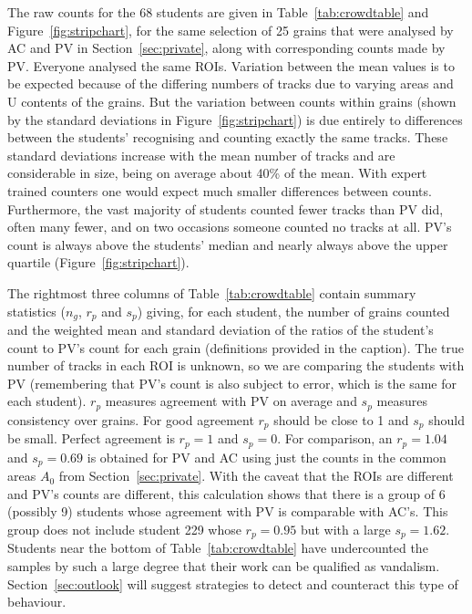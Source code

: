 \documentclass[gchron, manuscript]{copernicus}
\begin{document}
The raw counts for the 68 students are given in
Table~\ref{tab:crowdtable} and Figure~\ref{fig:stripchart}, for the
same selection of 25 grains that were analysed by AC and PV in
Section~\ref{sec:private}, along with corresponding counts made by
PV. Everyone analysed the same ROIs. Variation between the mean values
is to be expected because of the differing numbers of tracks due to
varying areas and U contents of the grains. But the variation between
counts within grains (shown by the standard deviations in
Figure~\ref{fig:stripchart}) is due entirely to differences between
the students' recognising and counting exactly the same tracks. These
standard deviations increase with the mean number of tracks and are
considerable in size, being on average about 40\% of the mean. With
expert trained counters one would expect much smaller differences
between counts.  Furthermore, the vast majority of students counted
fewer tracks than PV did, often many fewer, and on two occasions
someone counted no tracks at all. PV's count is always above the
students' median and nearly always above the upper quartile
(Figure~\ref{fig:stripchart}).\medskip

The rightmost three columns of Table~\ref{tab:crowdtable} contain
summary statistics ($n_g$, $r_p$ and $s_p$) giving, for each student,
the number of grains counted and the weighted mean and standard
deviation of the ratios of the student's count to PV's count for each
grain (definitions provided in the caption). The true number of tracks
in each ROI is unknown, so we are comparing the students with PV
(remembering that PV's count is also subject to error, which is the
same for each student). $r_p$ measures agreement with PV on average
and $s_p$ measures consistency over grains. For good agreement $r_p$
should be close to 1 and $s_p$ should be small.  Perfect agreement is
$r_p = 1$ and $s_p = 0$. For comparison, an $r_p = 1.04$ and $s_p =
0.69$ is obtained for PV and AC using just the counts in the common
areas $A_0$ from Section~\ref{sec:private}. With the caveat that the
ROIs are different and PV's counts are different, this calculation
shows that there is a group of 6 (possibly 9) students whose agreement
with PV is comparable with AC's. This group does not include student
229 whose $r_p = 0.95$ but with a large $s_p = 1.62$. Students near
the bottom of Table~\ref{tab:crowdtable} have undercounted the samples
by such a large degree that their work can be qualified as
vandalism. Section~\ref{sec:outlook} will suggest strategies to detect
and counteract this type of behaviour.\medskip
\end{document}
